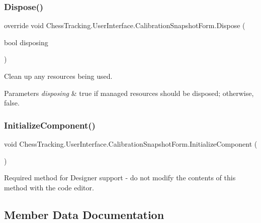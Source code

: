 \subsubsection{\texorpdfstring{Dispose()}{Dispose()}}
{\footnotesize\ttfamily override void Chess\+Tracking.\+User\+Interface.\+Calibration\+Snapshot\+Form.\+Dispose (\begin{DoxyParamCaption}\item[{bool}]{disposing }\end{DoxyParamCaption})\hspace{0.3cm}{\ttfamily [protected]}}



Clean up any resources being used. 


\begin{DoxyParams}{Parameters}
{\em disposing} & true if managed resources should be disposed; otherwise, false.\\
\hline
\end{DoxyParams}
\mbox{\label{class_chess_tracking_1_1_user_interface_1_1_calibration_snapshot_form_a84e93b5390fd2142c6eee5686b638a13}} 
\subsubsection{\texorpdfstring{InitializeComponent()}{InitializeComponent()}}
{\footnotesize\ttfamily void Chess\+Tracking.\+User\+Interface.\+Calibration\+Snapshot\+Form.\+Initialize\+Component (\begin{DoxyParamCaption}{ }\end{DoxyParamCaption})\hspace{0.3cm}{\ttfamily [private]}}



Required method for Designer support -\/ do not modify the contents of this method with the code editor. 



\subsection{Member Data Documentation}
\mbox{\label{class_chess_tracking_1_1_user_interface_1_1_calibration_snapshot_form_a199e33770b69a6ded5cda2a7f4bab6a0}} 
